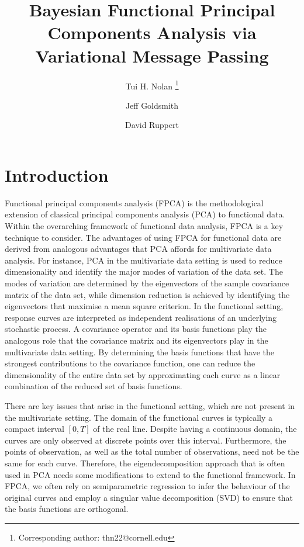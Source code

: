 \documentclass[12pt]{article}
\title{Bayesian Functional Principal Components Analysis via Variational Message Passing}
\author[1,2]{Tui H. Nolan \thanks{Corresponding author: thn22@cornell.edu}}
\author[3]{Jeff Goldsmith}
\author[1,4]{David Ruppert}
\affil[1]{School of Operations Research and Information Engineering, Cornell University}
\affil[2]{School of Mathematical and Physical Sciences, University of Technology Sydney}
\affil[3]{Mailman School of Public Health, Columbia University}
\affil[4]{School of Statistical Science, Cornell University}
\theoremstyle{plain}
\theoremstyle{definition}
\theoremstyle{remark}
\begin{document}
\maketitle


\section{Introduction}
\label{sec:intro}

Functional principal components analysis (FPCA) is the methodological extension of classical principal
components analysis (PCA) to functional data. Within the overarching framework of functional data analysis,
FPCA is a key technique to consider. The advantages of using FPCA for functional data are derived
from analogous advantages that PCA affords for multivariate data analysis. For instance, PCA in the multivariate
data setting is used to reduce dimensionality and identify the major modes of variation of the
data set. The modes of variation are determined by the eigenvectors of the sample covariance matrix of the data
set, while dimension reduction is achieved by identifying the eigenvectors that maximise a mean square criterion.
In the functional setting, response curves are interpreted as independent realisations of an underlying
stochastic process. A covariance operator and its basis functions play the analogous
role that the covariance matrix and its eigenvectors play in the multivariate data setting. By determining the
basis functions that have the strongest contributions to the covariance function, one can reduce the
dimensionality of the entire data set by approximating each curve as a linear combination of the reduced set
of basis functions.

There are key issues that arise in the functional setting, which are not present in the multivariate setting.
The domain of the functional curves is typically a compact interval $[0, T]$ of the real line.
Despite having a continuous domain, the curves are only observed at discrete points over this interval.
Furthermore, the points of observation, as well as the total number of observations, need not be the
same for each curve. Therefore, the eigendecomposition approach that is often used in PCA needs some
modifications to extend to the functional framework.
In FPCA, we often rely on semiparametric regression to infer the behaviour of the original curves and employ
a singular value decomposition (SVD) to ensure that the basis functions are orthogonal.
\end{document}
